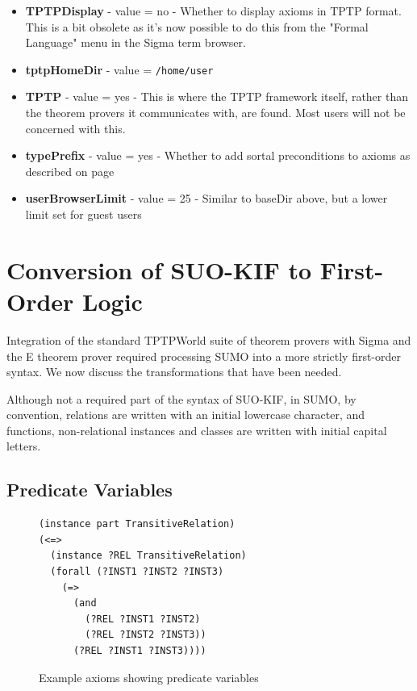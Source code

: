 \documentclass{book}
\begin{document}
\begin{itemize}
  \item \textbf{TPTPDisplay} - value = no - Whether to display axioms in TPTP format.  This is a bit
obsolete as it's now possible to do this from the "Formal Language" menu in the Sigma term browser.

  \item \textbf{tptpHomeDir} - value = \texttt{/home/user}

  \item \textbf{TPTP} - value = yes - This is where the TPTP framework itself, rather than the
theorem provers it communicates with, are found. Most users will not be concerned with this.

  \item \textbf{typePrefix} - value = yes - Whether to add sortal preconditions to axioms as described on
page \pageref{chap:KnowRep:subsec:Sortal}

  \item \textbf{userBrowserLimit} - value = 25 - Similar to baseDir above, but a lower
limit set for guest users

\end{itemize}


\section{Conversion of SUO-KIF to First-Order Logic}
\label{chap:KnowRepr:sec:Conv}

Integration of the standard TPTPWorld suite of theorem provers
with Sigma \cite{tsp08} and the E theorem prover \cite{Schulz:AICOM-2002}
required processing SUMO into a more strictly first-order syntax. We now discuss
the transformations that have been needed.

\small
Although not a required part of the syntax of SUO-KIF, in SUMO, by convention,
relations are written with an initial lowercase character, and functions,
non-relational instances and classes are written with initial capital letters.
\normalsize

\subsection{Predicate Variables}
\label{chap:KnowRep:subsec:PredVar}

\begin{figure}
\begin{framed}
\begin{verbatim}
(instance part TransitiveRelation)
(<=>
  (instance ?REL TransitiveRelation)
  (forall (?INST1 ?INST2 ?INST3)
    (=>
      (and
        (?REL ?INST1 ?INST2)
        (?REL ?INST2 ?INST3))
      (?REL ?INST1 ?INST3))))
\end{verbatim}
\caption{Example axioms showing predicate variables}
\label{fig:PredVarEx}
\end{framed}
\end{figure}
\end{document}
